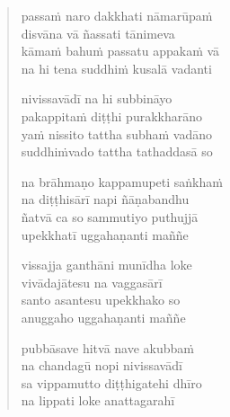 \clearpage
\begin{verse}

passaṁ naro dakkhati nāmarūpaṁ\\
disvāna vā ñassati tānimeva\\
kāmaṁ bahuṁ passatu appakaṁ vā\\
na hi tena suddhiṁ kusalā vadanti

nivissavādī na hi subbināyo\\
pakappitaṁ diṭṭhi purakkharāno\\
yaṁ nissito tattha subhaṁ vadāno\\
suddhiṁvado tattha tathaddasā so

na brāhmaṇo kappamupeti saṅkhaṁ\\
na diṭṭhisārī napi ñāṇabandhu\\
ñatvā ca so sammutiyo puthujjā\\
upekkhatī uggahaṇanti maññe

vissajja ganthāni munīdha loke\\
vivādajātesu na vaggasārī\\
santo asantesu upekkhako so\\
anuggaho uggahaṇanti maññe

pubbāsave hitvā nave akubbaṁ\\
na chandagū nopi nivissavādī\\
sa vippamutto diṭṭhigatehi dhīro\\
na lippati loke anattagarahī

\end{verse}


